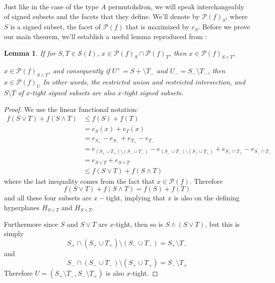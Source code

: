 \documentclass[12pt]{amsart}
\newtheorem{lemma}{Lemma}[section]
\numberwithin{equation}{section}
\newcommand{\pp}{\mathcal{P}}
\newcommand{\si}{\mathcal{S}}
\begin{document}
Just like in the case of the type $A$ permutohdron, we will speak interchangeably of signed subsets and the facets
that they define.  We'll denote by $\pp(f)_S$, where $S$ is a signed subset,  the facet of $\pp(f)$ that is maximized by $e_S$.
 Before we prove our main theorem,  we'll establish a useful lemma reproduced from \cite{Bisub}:  \\

 
\begin{lemma}
\label{lemma:restUnion}
If for $S,T\in \si(I)$,  $x \in \pp(f)_S \cap \pp(f)_T $,  then 
$x\in  \pp(f)_{S\vee T}$,

$x\in \pp(f)_{S\wedge T}$, and consequently if $U^+ = S+\setminus T_-$ and $U_- = S_-\setminus T_-$, then  $x\in \pp(f)_{U}$    In other words, the restricted union and restricted intersection, and $S\setminus T$ of
$x$-tight signed subsets are also $x$-tight signed subsets.
 \end{lemma}
 
 \begin{proof}
 We use the linear functional notation: 
 \begin{align*}
 f(S\vee T) + f(S\wedge T) & \leq  f(S) + f(T)\\
   & = e_S(x) + e_T(x)\\
    &=e_{S_+} - e_{S_-} + e_{T_+} - e_{T_-}  \\
    &= e_{(S_+\cup T_+ )\setminus (S_-\cup T_-)} - e_{  (S_-\cup T_-)\setminus (S_+\cup T_+ )} + e_{S_+\cap T_+} - e_{S_-\cap T_-} \\
    & = e_{S\vee T} + e_{S\wedge T}\\
   & \leq f(S\vee T) + f(S\wedge T)
      \end{align*}
   where the last inequality comes from the fact that $x\in \pp(f)$.  Therefore   
   $$f(S\vee T) + f(S\wedge T) =  f(S) + f(T)$$
   and all these four subsets are $x-$tight, implying that $x$ is also on the defining hyperplanes $H_{S\vee T} $ and $H_{S\wedge T}$.

Furthermore since $S$ and $S\vee T$ are $x$-tight, then so is $S\wedge(S\vee T)$, but this is simply 
$$ S_+\cap (S_+\cup T_+)\setminus(S_-\cup T_-) = S_+\setminus T_-$$
and 
$$ S_- \cap(S_-\cup T_-) \setminus(S_+\cup T_+)  = S_-\setminus T_+$$
 Therefore $U = (S_+\setminus T_-, S_-\setminus T_+)$ is also $x$-tight. 
 \end{proof}
\end{document}
